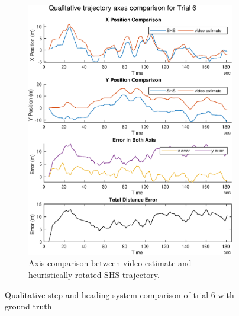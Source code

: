 \begin{figure}[H]
\begin{subfigure}[t]{.45\textwidth}
		\includegraphics[width=\linewidth]{images/20201201_2253_Qualitative_trajectory_axes_comparison_for_Trial_6_1}
		\caption{Axis comparison between video estimate and heuristically rotated SHS trajectory.}
		\label{fig:trial6_comparison}
	\end{subfigure}
\setlength{\belowcaptionskip}{-20pt}
	\caption{Qualitative step and heading system comparison of trial 6 with ground truth}
	\label{fig:trial6_shs_gt_comparison}
\end{figure}

